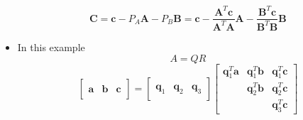 \documentclass[11pt]{article}
\begin{document}
\begin{itemize}
    \[\boldsymbol{C} = \boldsymbol{c} - P_A \boldsymbol{A} - P_B \boldsymbol{B} = 
    \boldsymbol{c} - \frac{\boldsymbol{A}^T \boldsymbol{c}}{\boldsymbol{A}^T \boldsymbol{A}} 
    \boldsymbol{A} - \frac{\boldsymbol{B}^T \boldsymbol{c}}{\boldsymbol{B}^T \boldsymbol{B}} 
    \boldsymbol{B}\]
    \item In this example
    \[ A = QR \]
    \[ 
    \begin{bmatrix}
        \ & \ & \ \\ 
        \boldsymbol{a} & \boldsymbol{b} & \boldsymbol{c} \\
        \ & \ & \ 
    \end{bmatrix} =
    \begin{bmatrix}
        \ & \ & \ \\ 
        \boldsymbol{q}_1 & \boldsymbol{q}_2 & \boldsymbol{q}_3 \\
        \ & \ & \ 
    \end{bmatrix}
    \begin{bmatrix}
        \boldsymbol{q}_1^T \boldsymbol{a} & \boldsymbol{q}_1^T \boldsymbol{b} & 
        \boldsymbol{q}_1^T \boldsymbol{c} \\
        \ & \boldsymbol{q}_2^T \boldsymbol{b} & \boldsymbol{q}_2^T \boldsymbol{c} \\
        \ & \ & \boldsymbol{q}_3^T \boldsymbol{c}
    \end{bmatrix}
    \]

\end{itemize}
\end{document}
